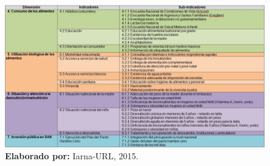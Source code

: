 \begin{landscape}
	
	\begin{figure}
		\centering
		\includegraphics[width=1.4\textwidth]{cuadro2}
				\caption{\textbf{Elaborado por:} Iarna-URL, 2015.}
		\label{cuadro2}
	\end{figure}
\end{landscape}

